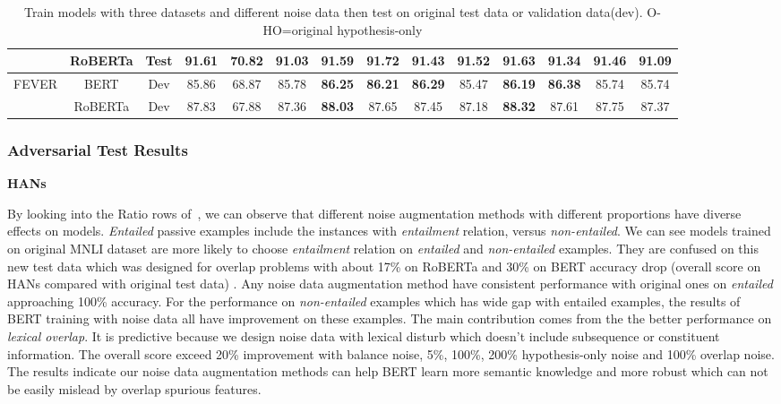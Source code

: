 \begin{table}[]
\begin{tabular}{|c|c|c|c|c|c|c|c|c|c|c|c|c|c|}
                         & RoBERTa                  & Test                       & 91.61                     & 70.82                        & 91.03                          & 91.59          & \textbf{91.72} & 91.43          & 91.52          & \textbf{91.63} & 91.34          & 91.46          & 91.09          \\ \hline
\multirow{2}{*}{FEVER}   & BERT                     & Dev                        & 85.86                     & 68.87                        & 85.78                          & \textbf{86.25} & \textbf{86.21} & \textbf{86.29} & 85.47          & \textbf{86.19} & \textbf{86.38} & 85.74          & 85.74          \\ \cline{2-14} 
                         & RoBERTa                  & Dev                        & 87.83                     & 67.88                        & 87.36                          & \textbf{88.03} & 87.65          & 87.45          & 87.18          & \textbf{88.32} & 87.61          & 87.75          & 87.37          \\ \hline
\end{tabular}
	\caption{Train models with three datasets and different noise data then test 
	on original test data or validation data(dev). O-HO=original hypothesis-only}
	\label{tab:original}
\end{table}




\subsubsection{Adversarial Test Results}

\textbf{HANs} 

By looking into the Ratio rows of~, we can observe
that different noise augmentation methods with different proportions 
have diverse effects on models.
\textit{Entailed} passive examples include the instances with \textit{entailment} 
relation, versus \textit{non-entailed}. 
We can see models trained on original MNLI dataset are more likely 
to choose \textit{entailment} relation on \textit{entailed} and \textit{non-entailed} examples. 
They are confused on this new test data which was designed for overlap problems 
with about 17\% on RoBERTa and 30\% on BERT accuracy drop 
(overall score on HANs compared with original test data) . 
Any noise data augmentation method have consistent performance with 
original ones on \textit{entailed} approaching 100\% accuracy. 
For the performance on \textit{non-entailed} examples which has wide gap 
with entailed examples, the results of BERT training with noise data all have 
improvement on these examples. The main contribution comes from the 
the better performance on \textit{lexical overlap}. It is predictive because 
we design noise data with lexical disturb which doesn't include subsequence or 
constituent information. The overall score exceed 20\% improvement with balance noise, 
5\%, 100\%, 200\%  hypothesis-only noise and 100\% overlap noise. The results indicate 
our noise data augmentation methods can help BERT learn more semantic knowledge 
and more robust which can not be easily mislead by overlap spurious features.

